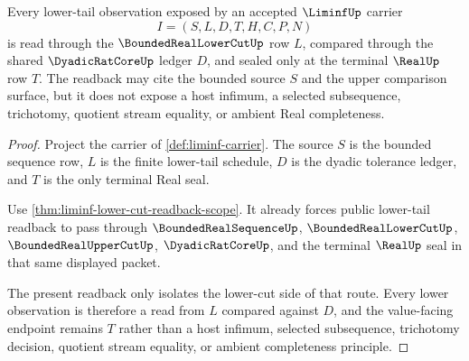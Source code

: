 \begin{theorem}
\label{thm:liminf-lower-cut-readback}
Every lower-tail observation exposed by an accepted $\LiminfUp$ carrier
$$
I=(S,L,D,T,H,C,P,N)
$$
is read through the $\BoundedRealLowerCutUp$ row $L$, compared through the shared $\DyadicRatCoreUp$ ledger $D$, and sealed only at the terminal $\RealUp$ row $T$. The readback may cite the bounded source $S$ and the upper comparison surface, but it does not expose a host infimum, a selected subsequence, trichotomy, quotient stream equality, or ambient Real completeness.
\end{theorem}
\begin{proof}
Project the carrier of \autoref{def:liminf-carrier}. The source $S$ is the bounded sequence row, $L$ is the finite lower-tail schedule, $D$ is the dyadic tolerance ledger, and $T$ is the only terminal Real seal.

Use \autoref{thm:liminf-lower-cut-readback-scope}. It already forces public lower-tail readback to pass through $\BoundedRealSequenceUp$, $\BoundedRealLowerCutUp$, $\BoundedRealUpperCutUp$, $\DyadicRatCoreUp$, and the terminal $\RealUp$ seal in that same displayed packet.

The present readback only isolates the lower-cut side of that route. Every lower observation is therefore a read from $L$ compared against $D$, and the value-facing endpoint remains $T$ rather than a host infimum, selected subsequence, trichotomy decision, quotient stream equality, or ambient completeness principle.
\end{proof}

